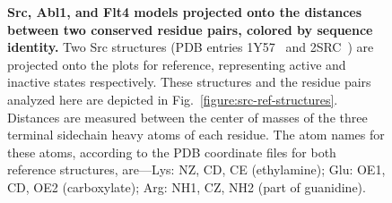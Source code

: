 \documentclass[aps,pre,twocolumn,nofootinbib,superscriptaddress,linenumbers]{revtex4-1}
\begin{document}
\begin{figure}


    \caption{{\bf Src, Abl1, and Flt4 models projected onto the distances between two conserved residue pairs, colored by sequence identity.}
    \color{red}
    Two Src structures (PDB entries 1Y57~\cite{cowan-jacob:2005:1y57} and 2SRC~\cite{xu:1999:2src}) are projected onto the plots for reference, representing active and inactive states respectively.
    These structures and the residue pairs analyzed here are depicted in Fig.~\ref{figure:src-ref-structures}.
    Distances are measured between the center of masses of the three terminal sidechain heavy atoms of each residue.
    The atom names for these atoms, according to the PDB coordinate files for both reference structures, are---Lys: NZ, CD, CE (ethylamine); Glu: OE1, CD, OE2 (carboxylate); Arg: NH1, CZ, NH2 (part of guanidine).
    }
  \label{figure:pair-distances}
\end{figure}
\end{document}
